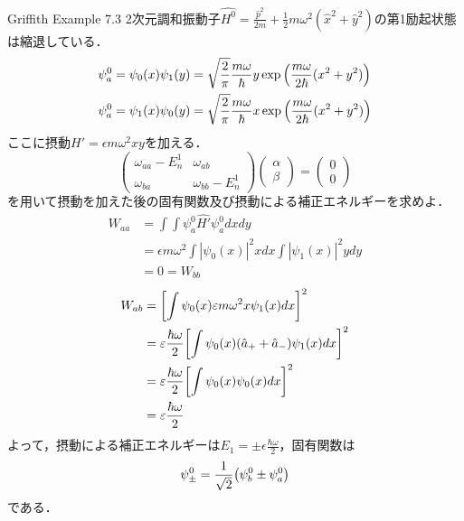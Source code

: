 \documentclass{standalone}
\begin{document}
  \begin{myexc}{Griffith Example 7.3}{}
    2次元調和振動子$\hat{H^0}=\frac{\hat{p}^2}{2m}+\frac{1}{2}m\omega^2(\hat{x}^2+\hat{y}^2)$の第1励起状態は縮退している．
    \begin{align}
      \psi^0_a&=\psi_0(x)\psi_1(y)=\sqrt{\frac{2}{\pi}}\frac{m\omega}{\hbar}y\exp\qty(\frac{m\omega}{2\hbar}(x^2+y^2))\\
      \psi^0_a&=\psi_1(x)\psi_0(y)=\sqrt{\frac{2}{\pi}}\frac{m\omega}{\hbar}x\exp\qty(\frac{m\omega}{2\hbar}(x^2+y^2))
    \end{align}
    ここに摂動$\hat{H'}=\epsilon m\omega^2xy$を加える．
    \begin{equation}
      \begin{pmatrix}
        \omega_{aa}-E_n^1&\omega_{ab}\\
        \omega_{ba}&\omega_{bb}-E_n^1
      \end{pmatrix}
      \begin{pmatrix}
        \alpha\\
        \beta
      \end{pmatrix}
      =
      \begin{pmatrix}
        0\\0
      \end{pmatrix}
    \end{equation}
    を用いて摂動を加えた後の固有関数及び摂動による補正エネルギーを求めよ．
    \tcblower
    \begin{align}
      W_{aa}&=\int\int\psi_a^0\hat{H'}\psi_a^0dxdy\\
      &=\epsilon m\omega^2\int|\psi_0(x)|^2xdx\int|\psi_1(x)|^2ydy\\
      &=0=W_{bb}
    \end{align}
    \begin{align}
      W_{ab}&=\qty[\int\psi_0(x)\varepsilon m\omega^2x\psi_1(x)dx]^2\\
      &=\varepsilon\frac{\hbar\omega}{2}\qty[\int\psi_0(x)(\hat{a}_{+}+\hat{a}_{-})\psi_1(x)dx]^2\\
      &=\varepsilon\frac{\hbar\omega}{2}\qty[\int\psi_0(x)\psi_0(x)dx]^2\\
      &=\varepsilon\frac{\hbar\omega}{2}
    \end{align}
    よって，摂動による補正エネルギーは$E_1=\pm\epsilon\frac{\hbar\omega}{2}$，固有関数は
    \begin{equation}
      \psi_{\pm}^0=\frac{1}{\sqrt{2}}\qty(\psi_b^0\pm\psi_a^0)
    \end{equation}
    である．
  \end{myexc}
\end{document}
